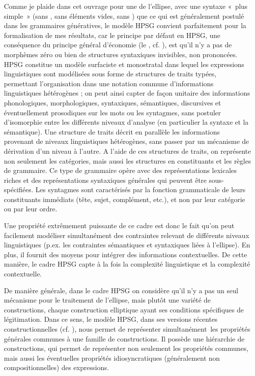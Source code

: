 Comme je plaide dans cet ouvrage pour une  de l’el\-lipse, avec une syntaxe «~plus simple~» (sans , sans éléments vides, sans ) que ce qui est généralement postulé dans les grammaires géné\-ratives, le modèle HPSG convient parfaitement pour la formalisation de mes résultats, car le principe par défaut en HPSG, une conséquence du principe général d’économie (le , cf. \citealt{Miller1997b}), est qu’il n’y a pas de morphèmes zéro ou bien de structures syntaxiques invisibles, non prononcées. HPSG constitue un modèle surfaciste et monostratal dans lequel les expressions linguistiques sont modélisées sous forme de structures de traits typées, permettant l’organisation dans une notation commune d’informations linguistiques hétéro\-gènes ; on peut ainsi capter de façon unitaire des informations phonologiques, morphologiques, syntaxiques, sémantiques, discursives et éventuellement proso\-diques sur les mots ou les syntagmes, sans postuler d’isomorphie entre les différents niveaux d’analyse (en particulier la syntaxe et la sémantique). Une structure de traits décrit en parallèle les informations provenant de niveaux linguistiques hétérogènes, sans passer par un mécanisme de dérivation d’un niveau à l’autre. A l’aide de ces structures de traits, on représente non seulement les catégories, mais aussi les structures en constituants et les règles de grammaire. Ce type de grammaire opère avec des représentations lexicales riches et des représentations syntaxiques générales qui peuvent être sous-spécifiées. Les syntagmes sont caractérisés par la fonction grammaticale de leurs constituants immédiats (tête, sujet, complément, etc.), et non par leur catégorie ou par leur ordre.



Une propriété extrêmement puissante de ce cadre est donc le fait qu’on peut facilement modéliser simultanément des contraintes relevant de différents ni\-veaux linguistiques (p.ex. les contraintes sémantiques et syntaxiques liées à l’el\-lipse). En plus, il fournit des moyens pour intégrer des informations contextuelles. De cette manière, le cadre HPSG capte à la fois la complexité linguistique et la complexité contextuelle.



De manière générale, dans le cadre HPSG on considère qu’il n’y a pas un seul mécanisme pour le traitement de l’ellipse, mais plutôt une variété de constructions, chaque construction elliptique ayant ses conditions spécifiques de légitimation. Dans ce sens, le modèle HPSG, dans ses versions récentes constructionnelles (cf. \citealt{Sag1997,GinzburgEtAl2000,SagEtAl2003,Sag2012}), nous permet de représenter simultanément~les propriétés générales communes à une famille de constructions. Il possède une hiérarchie de constructions, qui permet de représenter non seulement les propriétés communes, mais aussi les éventu\-elles propriétés idiosyncratiques (généralement non compositionnelles) des expressions. 



